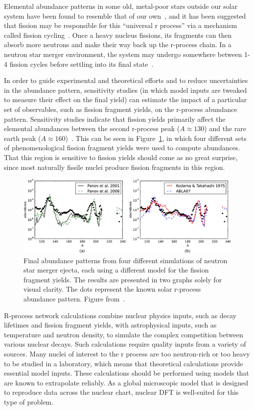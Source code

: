 Elemental abundance patterns in some old, metal-poor stars outside our solar system have been found to resemble that of our own~\cite{Arnould2007}, and it has been suggested that fission may be responsible for this ``universal r process'' via a mechanism called fission cycling~\cite{Beun2008}. Once a heavy nucleus fissions, its fragments can then absorb more neutrons and make their way back up the r-process chain. In a neutron star merger environment, the system may undergo somewhere between 1-4 fission cycles before settling into its final state~\cite{Mendoza2015}.

In order to guide experimental and theoretical efforts and to reduce uncertainties in the abundance pattern, sensitivity studies (in which model inputs are tweaked to measure their effect on the final yield) can estimate the impact of a particular set of observables, such as fission fragment yields, on the r-process abundance pattern. Sensitivity studies indicate that fission yields primarily affect the elemental abundances between the second r-process peak ($A\approx130$) and the rare earth peak ($A\approx160$)~\cite{Goriely2015a, Eichler2015}. This can be seen in Figure~\ref{fig:rprocabundances}, in which four different sets of phenomenological fission fragment yields were used to compute abundances. That this region is sensitive to fission yields should come as no great surprise, since most naturally fissile nuclei produce fission fragments in this region.

\begin{figure}
	\centering
	\includegraphics[width=0.9\linewidth]{TeX_files/rProc_abundances}
	\caption{Final abundance patterns from four different simulations of neutron star merger ejecta, each using a different model for the fission fragment yields. The results are presented in two graphs solely for visual clarity. The dots represent the known solar r-process abundance pattern. Figure from~\cite{Eichler2015}.}
	\label{fig:rprocabundances}
\end{figure}

R-process network calculations combine nuclear physics inputs, such as decay lifetimes and fission fragment yields, with astrophysical inputs, such as temperature and neutron density, to simulate the complex competition between various nuclear decays. Such calculations require quality inputs from a variety of sources. Many nuclei of interest to the r process are too neutron-rich or too heavy to be studied in a laboratory, which means that theoretical calculations provide essential model inputs. These calculations should be performed using models that are known to extrapolate reliably. As a global microscopic model that is designed to reproduce data across the nuclear chart, nuclear DFT is well-suited for this type of problem.

